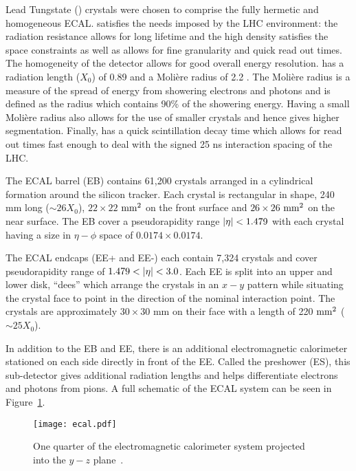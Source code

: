 Lead Tungstate (\pbw) crystals were chosen to comprise the fully hermetic and
homogeneous ECAL. \pbw satisfies the needs imposed by the LHC environment: the
radiation resistance allows for long lifetime and the high density satisfies
the space constraints as well as allows for fine granularity and quick read
out times. The homogeneity of the detector allows for good overall energy
resolution. \pbw has a radiation length ($X_0$) of 0.89 \cm and a Moli\`ere
radius of 2.2 \cm. The Moli\`ere radius is a measure of the spread of energy
from showering electrons and photons and is defined as the radius which
contains 90\% of the showering energy. Having a small Moli\`ere radius also
allows for the use of smaller crystals and hence gives higher segmentation.
Finally, \pbw has a quick scintillation decay time which allows for read out
times fast enough to deal with the signed 25 ns interaction spacing of the LHC.

The ECAL barrel (EB) contains 61,200 \pbw crystals arranged in a cylindrical
formation around the silicon tracker. Each crystal is rectangular in shape, 240
mm long ($\sim 26 X_0$), $22 \times 22$ $\rm{mm^2}$ on the front surface and
$26 \times 26$ $\rm{mm^2}$ on the near surface. The EB cover a pseudorapidity
range $\left|\eta\right| < 1.479$ with each crystal having a size in $\eta - \phi$ space of
$0.0174 \times 0.0174$.

The ECAL endcaps (EE+ and EE-) each contain 7,324 \pbw crystals and cover
pseudorapidity range of $1.479 < \left|\eta\right| < 3.0$. Each EE is split into an upper
and lower disk, ``dees'' which arrange the crystals in an $x - y$ pattern while
situating the crystal face to point in the direction of the nominal interaction
point. The crystals are approximately $30 \times 30$ mm on their face with a
length of 220 $\rm{mm^2}$ ($\sim 25 X_0$).

In addition to the EB and EE, there is an additional electromagnetic calorimeter
stationed on each side directly in front of the EE. Called the preshower (ES),
this sub-detector gives additional radiation lengths and helps differentiate
electrons and photons from pions. A full schematic of the ECAL system can be
seen in Figure~\ref{fig:cms_ecal}.

\begin{figure}[!htb]
\begin{center}
\texttt{[image: ecal.pdf]}
\caption{\label{fig:cms_ecal}
One quarter of the electromagnetic calorimeter system projected into the $y-z$
plane~\cite{tdr1}.
}
\end{center}
\end{figure}

